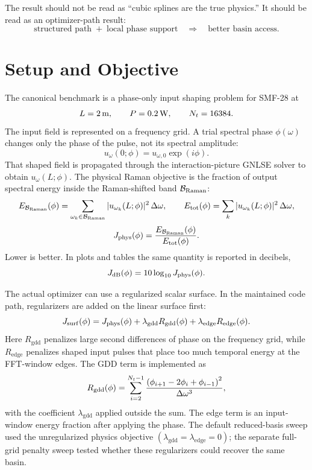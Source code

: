 \documentclass[11pt]{article}
\begin{document}
The result should not be read as ``cubic splines are the true physics.'' It
should be read as an optimizer-path result:
\[
    \text{structured path} \;+\; \text{local phase support}
    \quad \Longrightarrow \quad
    \text{better basin access}.
\]

\section{Setup and Objective}

The canonical benchmark is a phase-only input shaping problem for SMF-28 at
\[
    L = 2\,\mathrm{m}, \qquad P = 0.2\,\mathrm{W}, \qquad N_t = 16384 .
\]
The input field is represented on a frequency grid. A trial spectral phase
\(\phi(\omega)\) changes only the phase of the pulse, not its spectral
amplitude:
\[
    u_\omega(0;\phi) = u_{\omega,0}\exp(i\phi).
\]
That shaped field is propagated through the interaction-picture GNLSE solver to
obtain \(u_\omega(L;\phi)\). The physical Raman objective is the fraction of
output spectral energy inside the Raman-shifted band \(\mathcal{B}_{\mathrm{Raman}}\):
\[
    E_{\mathcal{B}_{\mathrm{Raman}}}(\phi) =
    \sum_{\omega_k\in\mathcal{B}_{\mathrm{Raman}}} |u_{\omega_k}(L;\phi)|^2\,\Delta\omega,
    \qquad
    E_{\mathrm{tot}}(\phi) =
    \sum_k |u_{\omega_k}(L;\phi)|^2\,\Delta\omega,
\]
\[
    J_{\mathrm{phys}}(\phi) =
    \frac{E_{\mathcal{B}_{\mathrm{Raman}}}(\phi)}{E_{\mathrm{tot}}(\phi)}.
\]
Lower is better. In plots and tables the same quantity is reported in decibels,
\[
    J_{\mathrm{dB}}(\phi)=10\log_{10}J_{\mathrm{phys}}(\phi).
\]

The actual optimizer can use a regularized scalar surface. In the maintained
code path, regularizers are added on the linear surface first:
\[
    J_{\mathrm{surf}}(\phi)
    =
    J_{\mathrm{phys}}(\phi)
    + \lambda_{\mathrm{gdd}} R_{\mathrm{gdd}}(\phi)
    + \lambda_{\mathrm{edge}} R_{\mathrm{edge}}(\phi).
\]
Here \(R_{\mathrm{gdd}}\) penalizes large second differences of phase on the
frequency grid, while \(R_{\mathrm{edge}}\) penalizes shaped input pulses that
place too much temporal energy at the FFT-window edges. The GDD term is
implemented as
\[
    R_{\mathrm{gdd}}(\phi)
    =
    \sum_{i=2}^{N_t-1}
    \frac{\left(\phi_{i+1}-2\phi_i+\phi_{i-1}\right)^2}{\Delta\omega^3},
\]
with the coefficient \(\lambda_{\mathrm{gdd}}\) applied outside the sum. The
edge term is an input-window energy fraction after applying the phase. The
default reduced-basis sweep used the unregularized physics objective
\((\lambda_{\mathrm{gdd}}=\lambda_{\mathrm{edge}}=0)\); the separate full-grid
penalty sweep tested whether these regularizers could recover the same basin.
\end{document}
